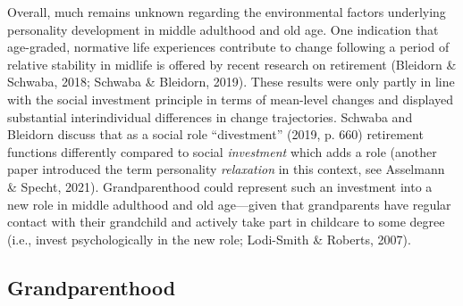 \documentclass[
  english,
  man, noextraspace]{apa7}
\begin{document}
Overall, much remains unknown regarding the environmental factors underlying personality development in middle adulthood and old age. One indication that age-graded, normative life experiences contribute to change following a period of relative stability in midlife is offered by recent research on retirement (Bleidorn \& Schwaba, 2018; Schwaba \& Bleidorn, 2019). These results were only partly in line with the social investment principle in terms of mean-level changes and displayed substantial interindividual differences in change trajectories. Schwaba and Bleidorn discuss that as a social role \enquote{divestment} (2019, p. 660) retirement functions differently compared to social \emph{investment} which adds a role (another paper introduced the term personality \emph{relaxation} in this context, see Asselmann \& Specht, 2021). Grandparenthood could represent such an investment into a new role in middle adulthood and old age---given that grandparents have regular contact with their grandchild and actively take part in childcare to some degree (i.e., invest psychologically in the new role; Lodi-Smith \& Roberts, 2007).

\hypertarget{grandparenthood}{%
\subsection{Grandparenthood}\label{grandparenthood}}
\end{document}
